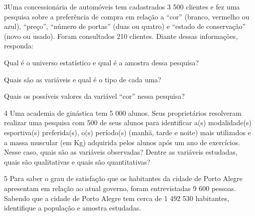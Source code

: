 
\num{3}Uma concessionária de automóveis tem cadastrados 3 500 clientes e
fez uma pesquisa sobre a preferência de compra em relação a ``cor''
(branco, vermelho ou azul), ``preço'', ``número de portas'' (duas ou
quatro) e ``estado de conservação'' (novo ou usado). Foram consultados
210 clientes. Diante dessas informações, responda:

\begin{escolha}
\item
  Qual é o universo estatístico e qual é a amostra dessa pesquisa?


\item
  Quais são as variáveis e qual é o tipo de cada uma?


\item
  Quais os possíveis valores da variável ``cor'' nessa pesquisa?

\end{escolha}


\num{4} Uma academia de ginástica tem 5 000 alunos. Seus proprietários
resolveram realizar uma pesquisa com 500 de seus alunos para identificar
a(s) modalidade(s) esportiva(s) preferida(s), o(s) período(s) (manhã,
tarde e noite) mais utilizados e a massa muscular (em Kg) adquirida
pelos alunos após um ano de exercícios. Nesse caso, quais são as
variáveis observadas? Dentre as variáveis estudadas, quais são
qualitativas e quais são quantitativas?



\num{5} Para saber o grau de satisfação que os habitantes da cidade de Porto
Alegre apresentam em relação ao atual governo, foram entrevistadas 9 600
pessoas. Sabendo que a cidade de Porto Alegre tem cerca de 1 492 530
habitantes, identifique a população e amostra estudadas.


